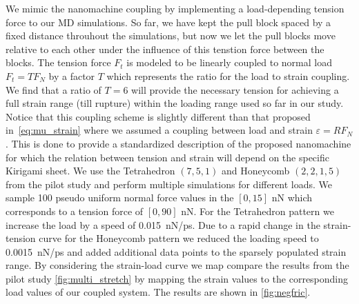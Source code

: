 We mimic the nanomachine coupling by implementing a load-depending tension force to our \acrshort{MD} simulations. So far, we have kept the pull block spaced by a fixed distance throuhout the simulations, but now we let the pull blocks move relative to each other under the influence of this tenstion force between the blocks. The tension force $F_t$ is modeled to be linearly coupled to normal load $F_t = TF_N$ by a factor $T$ which represents the ratio for the load to strain coupling. We find that a ratio of
$T=6$ will provide the necessary tension for achieving a full strain range (till rupture) within the loading range used so far in our study. Notice that this coupling scheme is slightly different than that proposed in~\cref{eq:mu_strain} where we assumed a coupling between load and strain $\varepsilon = R F_N$. This is done to provide a standardized description of the proposed nanomachine for which the relation between tension and strain will depend on the specific Kirigami sheet. We use the Tetrahedron
$(7,5,1)$ and Honeycomb $(2,2,1,5)$ from the pilot study and perform multiple
simulations for different loads. We sample 100 pseudo uniform normal force
values in the $[0, 15]$ nN which corresponds to a tension force of $[0, 90]$ nN. For the Tetrahedron pattern we increase the load by a speed of \SI{0.015}{nN/ps}. Due to a rapid change in the strain-tension curve for the Honeycomb pattern we reduced the loading speed to \SI{0.0015}{nN/ps} and added additional data points to the sparsely populated strain range. By considering the strain-load curve we map compare the results from the pilot study \cref{fig:multi_stretch} by mapping the strain values to the corresponding load values of our coupled system. The results are shown in \cref{fig:negfric}.


